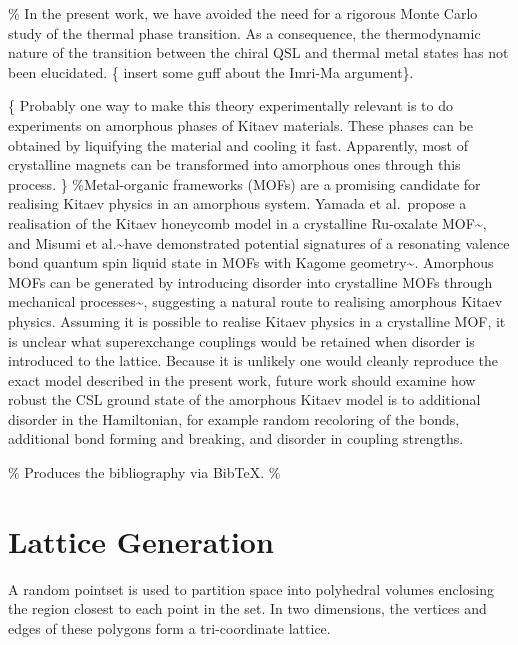 \% In the present work, we have avoided the need for a rigorous Monte
Carlo study of the thermal phase transition. As a consequence, the
thermodynamic nature of the transition between the chiral QSL and
thermal metal states has not been elucidated. \{\color{red} insert some
guff about the Imri-Ma argument\}.

\{\color{red} Probably one way to make this theory experimentally
relevant is to do experiments on amorphous phases of Kitaev materials.
These phases can be obtained by liquifying the material and cooling it
fast. Apparently, most of crystalline magnets can be transformed into
amorphous ones through this process. \} \%Metal-organic frameworks
(MOFs) are a promising candidate for realising Kitaev physics in an
amorphous system. Yamada et al.~propose a realisation of the Kitaev
honeycomb model in a crystalline Ru-oxalate
MOF\textasciitilde{}\cite{yamadaDesigningKitaevSpin2017}, and Misumi et
al.\textasciitilde have demonstrated potential signatures of a
resonating valence bond quantum spin liquid state in MOFs with Kagome
geometry\textasciitilde{}\cite{misumiQuantumSpinLiquid2020}. Amorphous
MOFs can be generated by introducing disorder into crystalline MOFs
through mechanical
processes\textasciitilde{}\cite{bennettAmorphousMetalOrganic2014},
suggesting a natural route to realising amorphous Kitaev physics.
Assuming it is possible to realise Kitaev physics in a crystalline MOF,
it is unclear what superexchange couplings would be retained when
disorder is introduced to the lattice. Because it is unlikely one would
cleanly reproduce the exact model described in the present work, future
work should examine how robust the CSL ground state of the amorphous
Kitaev model is to additional disorder in the Hamiltonian, for example
random recoloring of the bonds, additional bond forming and breaking,
and disorder in coupling strengths.



\% Produces the bibliography via BibTeX. \% \clearpage

\appendix

\section{Lattice Generation} \label{apx:lattice_construction}

A random pointset is used to partition space into polyhedral volumes
enclosing the region closest to each point in the set. In two
dimensions, the vertices and edges of these polygons form a
tri-coordinate lattice.


